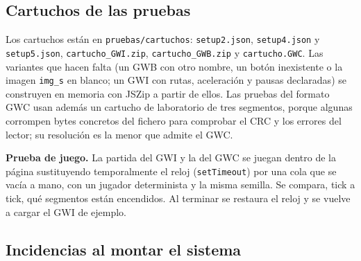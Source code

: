 \subsection{Cartuchos de las pruebas}
\label{sec:F5I18Cartuchos}

Los cartuchos están en \texttt{pruebas/cartuchos}: \texttt{setup2.json}, \texttt{setup4.json} y \texttt{setup5.json}, \texttt{cartucho\_GWI.zip}, \texttt{cartucho\_GWB.zip} y \texttt{cartucho.GWC}. Las variantes que hacen falta (un GWB con otro nombre, un botón inexistente o la imagen \texttt{img\_s} en blanco; un GWI con rutas, aceleración y pausas declaradas) se construyen en memoria con JSZip a partir de ellos. Las pruebas del formato GWC usan además un cartucho de laboratorio de tres segmentos, porque algunas corrompen bytes concretos del fichero para comprobar el CRC y los errores del lector; su resolución es la menor que admite el GWC.

\textbf{Prueba de juego.} La partida del GWI y la del GWC se juegan dentro de la página sustituyendo temporalmente el reloj (\texttt{setTimeout}) por una cola que se vacía a mano, con un jugador determinista y la misma semilla. Se compara, tick a tick, qué segmentos están encendidos. Al terminar se restaura el reloj y se vuelve a cargar el GWI de ejemplo.

\subsection{Incidencias al montar el sistema}
\label{sec:F5I18Incidencias}

